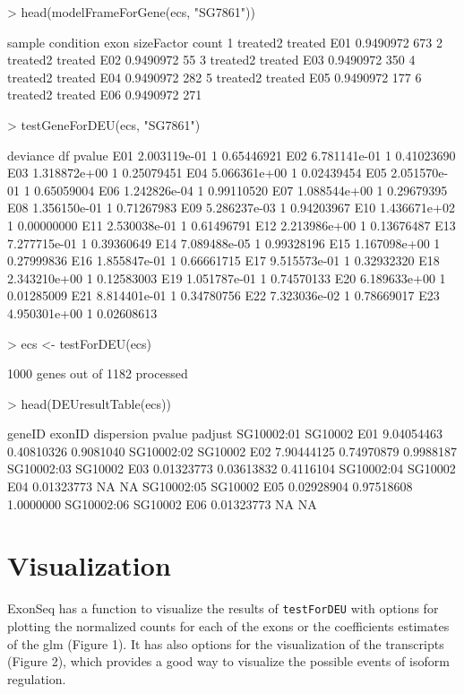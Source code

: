 \documentclass{article}
\begin{document}
\begin{Schunk}
\begin{Sinput}
> head(modelFrameForGene(ecs, "SG7861"))
\end{Sinput}
\begin{Soutput}
    sample condition exon sizeFactor count
1 treated2   treated  E01  0.9490972   673
2 treated2   treated  E02  0.9490972    55
3 treated2   treated  E03  0.9490972   350
4 treated2   treated  E04  0.9490972   282
5 treated2   treated  E05  0.9490972   177
6 treated2   treated  E06  0.9490972   271
\end{Soutput}
\begin{Sinput}
> testGeneForDEU(ecs, "SG7861")
\end{Sinput}
\begin{Soutput}
        deviance df     pvalue
E01 2.003119e-01  1 0.65446921
E02 6.781141e-01  1 0.41023690
E03 1.318872e+00  1 0.25079451
E04 5.066361e+00  1 0.02439454
E05 2.051570e-01  1 0.65059004
E06 1.242826e-04  1 0.99110520
E07 1.088544e+00  1 0.29679395
E08 1.356150e-01  1 0.71267983
E09 5.286237e-03  1 0.94203967
E10 1.436671e+02  1 0.00000000
E11 2.530038e-01  1 0.61496791
E12 2.213986e+00  1 0.13676487
E13 7.277715e-01  1 0.39360649
E14 7.089488e-05  1 0.99328196
E15 1.167098e+00  1 0.27999836
E16 1.855847e-01  1 0.66661715
E17 9.515573e-01  1 0.32932320
E18 2.343210e+00  1 0.12583003
E19 1.051787e-01  1 0.74570133
E20 6.189633e+00  1 0.01285009
E21 8.814401e-01  1 0.34780756
E22 7.323036e-02  1 0.78669017
E23 4.950301e+00  1 0.02608613
\end{Soutput}
\begin{Sinput}
> ecs <- testForDEU(ecs)
\end{Sinput}
\begin{Soutput}
1000 genes out of 1182 processed
\end{Soutput}
\begin{Sinput}
> head(DEUresultTable(ecs))
\end{Sinput}
\begin{Soutput}
            geneID exonID dispersion     pvalue   padjust
SG10002:01 SG10002    E01 9.04054463 0.40810326 0.9081040
SG10002:02 SG10002    E02 7.90444125 0.74970879 0.9988187
SG10002:03 SG10002    E03 0.01323773 0.03613832 0.4116104
SG10002:04 SG10002    E04 0.01323773         NA        NA
SG10002:05 SG10002    E05 0.02928904 0.97518608 1.0000000
SG10002:06 SG10002    E06 0.01323773         NA        NA
\end{Soutput}
\end{Schunk}
\section{Visualization}
ExonSeq has a function to visualize the results of \texttt{testForDEU} with options for plotting the normalized counts for each of the exons or the coefficients estimates of the glm (Figure 1). It has also options for the visualization of the transcripts (Figure 2), which provides a good way to visualize the possible events of isoform regulation. \\
\end{document}
